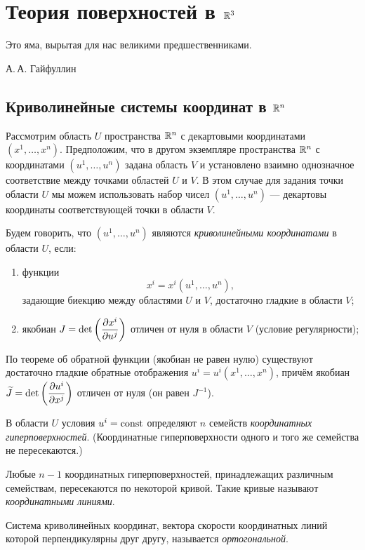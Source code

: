 \section{Теория поверхностей в $\mathbb{R}^3$}

\epigraph{Это яма, вырытая для нас великими предшественниками.}{А.\,А. Гайфуллин}

\subsection{Криволинейные системы координат в $\mathbb{R}^n$}

Рассмотрим область $U$ пространства $\mathbb{R}^n$ с декартовыми координатами $(x^1, \ldots, x^n)$. Предположим, что в другом экземпляре пространства $\mathbb{R}^n$ с координатами $(u^1, \ldots, u^n)$ задана область $V$ и установлено взаимно однозначное соответствие между точками областей $U$ и $V$. В этом случае для задания точки области $U$ мы можем использовать набор чисел $(u^1, \ldots, u^n)$ --- декартовы координаты соответствующей точки в области $V$.

\begin{definition}
	Будем говорить, что $(u^1, \ldots, u^n)$ являются \textit{криволинейными координатами} в области $U$, если:
	\begin{enumerate}[nolistsep, label=(\arabic*)]
		\item функции
			\[
				x^i = x^i(u^1, \ldots, u^n),
			\]
			задающие биекцию между областями $U$ и $V$, достаточно гладкие в области $V$;
		\item якобиан $\displaystyle J = \det\left(\frac{\partial x^i}{\partial u^j}\right)$ отличен от нуля в области $V$ (условие регулярности);
	\end{enumerate}
\end{definition}

По теореме об обратной функции (якобиан не равен нулю) существуют достаточно гладкие обратные отображения $u^i = u^i(x^1, \ldots, x^n)$, причём якобиан $\displaystyle\widetilde{J} = \det\left(\frac{\partial u^i}{\partial x^j}\right)$ отличен от нуля (он равен $J^{-1}$).

В области $U$ условия $u^i = \mathrm{const}$ определяют $n$ семейств \textit{координатных гиперповерхностей}. (Координатные гиперповерхности одного и того же семейства не пересекаются.)

Любые $n - 1$ координатных гиперповерхностей, принадлежащих различным семействам, пересекаются по некоторой кривой. Такие кривые называют \textit{координатными линиями}.

\begin{definition}
	Система криволинейных координат, вектора скорости координатных линий которой перпендикулярны друг другу, называется \textit{ортогональной}.
\end{definition}

